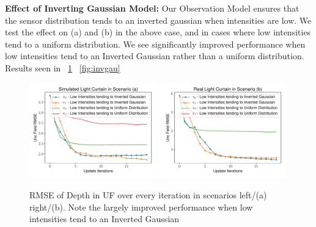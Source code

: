 \textbf{Effect of Inverting Gaussian Model:} Our Observation Model ensures that the sensor distribution tends to an inverted gaussian when intensities are low. We test the effect on (a) and (b) in the above case, and in cases where low intensities tend to a uniform distribution. We see significantly improved performance when low intensities tend to an Inverted Gaussian rather than a uniform distribution. Results seen in ~\ref{fig:figure01} ~\ref{fig:invgau}

\begin{figure}[h]
    \centering
    \begin{minipage}{0.5\textwidth}
        \centering
        \includegraphics[width=0.49\textwidth]{figures/Figure_1.pdf}
        \includegraphics[width=0.49\textwidth]{figures/Figure_0.pdf}
    \end{minipage}\hfill
    \centering
    \caption{RMSE of Depth in UF over every iteration in scenarios left/(a) right/(b). Note the largely improved performance when low intensities tend to an Inverted Gaussian}
    \label{fig:figure01}
\end{figure}

